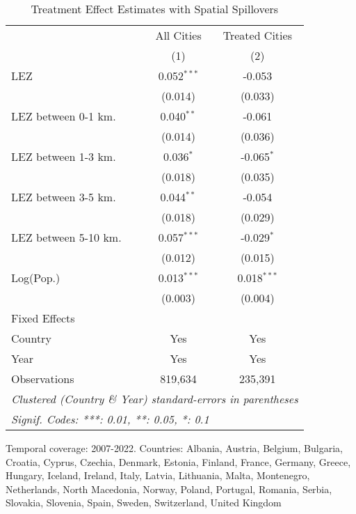 
\begin{table}[htbp]
   \caption{\label{tab:te_spillovers} Treatment Effect Estimates with Spatial Spillovers}
   \centering
   \small
   \begin{tabular}{lcc}
      \tabularnewline \midrule \midrule
                           & All Cities    & Treated Cities \\   
                           & (1)           & (2)\\  
      LEZ                  & 0.052$^{***}$ & -0.053\\   
                           & (0.014)       & (0.033)\\   
      LEZ between 0-1 km.  & 0.040$^{**}$  & -0.061\\   
                           & (0.014)       & (0.036)\\   
      LEZ between 1-3 km.  & 0.036$^{*}$   & -0.065$^{*}$\\   
                           & (0.018)       & (0.035)\\   
      LEZ between 3-5 km.  & 0.044$^{**}$  & -0.054\\   
                           & (0.018)       & (0.029)\\   
      LEZ between 5-10 km. & 0.057$^{***}$ & -0.029$^{*}$\\   
                           & (0.012)       & (0.015)\\   
      Log(Pop.)            & 0.013$^{***}$ & 0.018$^{***}$\\   
                           & (0.003)       & (0.004)\\   
      Fixed Effects\\
      Country              & Yes           & Yes\\  
      Year                 & Yes           & Yes\\  
      \midrule 
      Observations         & 819,634       & 235,391\\  
      \midrule \midrule
      \multicolumn{3}{l}{\emph{Clustered (Country \& Year) standard-errors in parentheses}}\\
      \multicolumn{3}{l}{\emph{Signif. Codes: ***: 0.01, **: 0.05, *: 0.1}}\\
   \end{tabular}
   
   \par \raggedright 
   Temporal coverage: 2007-2022. Countries: Albania, Austria, Belgium, Bulgaria, Croatia, Cyprus, Czechia, Denmark, Estonia, Finland, France, Germany, Greece, Hungary, Iceland, Ireland, Italy, Latvia, Lithuania, Malta, Montenegro, Netherlands, North Macedonia, Norway, Poland, Portugal, Romania, Serbia, Slovakia, Slovenia, Spain, Sweden, Switzerland, United Kingdom
\end{table}


